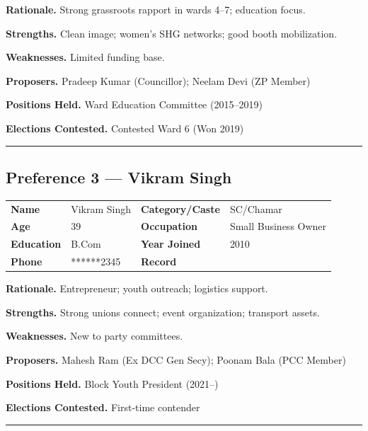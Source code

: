 \textbf{Rationale.} Strong grassroots rapport in wards 4–7; education focus.

\textbf{Strengths.} Clean image; women’s SHG networks; good booth mobilization.

\textbf{Weaknesses.} Limited funding base.

\textbf{Proposers.} Pradeep Kumar (Councillor); Neelam Devi (ZP Member)

\textbf{Positions Held.} Ward Education Committee (2015–2019)

\textbf{Elections Contested.} Contested Ward 6 (Won 2019)

\vspace{8pt}\hrule\vspace{10pt}

\subsection*{Preference 3 — Vikram Singh}
\begin{tabularx}{\linewidth}{@{}lY lY@{}}
\textbf{Name} & Vikram Singh & \textbf{Category/Caste} & SC/Chamar \\
\textbf{Age} & 39 & \textbf{Occupation} & Small Business Owner \\
\textbf{Education} & B.Com & \textbf{Year Joined} & 2010 \\
\textbf{Phone} & ******2345 & \textbf{Record} &  \\
\end{tabularx}

\textbf{Rationale.} Entrepreneur; youth outreach; logistics support.

\textbf{Strengths.} Strong unions connect; event organization; transport assets.

\textbf{Weaknesses.} New to party committees.

\textbf{Proposers.} Mahesh Ram (Ex DCC Gen Secy); Poonam Bala (PCC Member)

\textbf{Positions Held.} Block Youth President (2021–)

\textbf{Elections Contested.} First-time contender

\vspace{8pt}\hrule\vspace{10pt}
